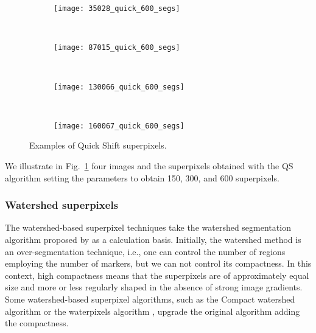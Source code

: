 \begin{figure}[!ht]
    \begin{subfigure}[t]{\textwidth+20pt\relax}
    	\texttt{[image: 35028\_quick\_600\_segs]} 
    \end{subfigure}      
    ~ %
    \begin{subfigure}[b]{0.2\textwidth}
        \texttt{[image: 87015\_quick\_600\_segs]}
    \end{subfigure}
    ~ %
    \begin{subfigure}[b]{0.2\textwidth}
        \texttt{[image: 130066\_quick\_600\_segs]}
    \end{subfigure}
    ~ %
    \begin{subfigure}[b]{0.2\textwidth}
        \texttt{[image: 160067\_quick\_600\_segs]}
    \end{subfigure}     

	\caption{Examples of Quick Shift superpixels.}\label{fig:quick_suprepixels}    
\end{figure}

We illustrate in Fig.\ \ref{fig:quick_suprepixels} four images and the superpixels obtained with the QS algorithm setting the parameters to obtain 150, 300, and 600 superpixels. 


\subsubsection{Watershed superpixels}%
The watershed-based superpixel techniques take the watershed segmentation algorithm proposed by \citep{Meyer:ICIP:1992} as a calculation basis. Initially, the watershed method is an over-segmentation technique, i.e., one can control the number of regions employing the number of markers, but we can not control its compactness. In this context, high compactness means that the superpixels are of approximately equal size and more or less regularly shaped in the absence of strong image gradients. Some watershed-based superpixel algorithms, such as the Compact watershed algorithm \citep{Neubert.Protzel:ICPR:2014} or the waterpixels algorithm \citep{Machairas.Faessel.ea:IP:2015}, upgrade the original algorithm adding the compactness. 

